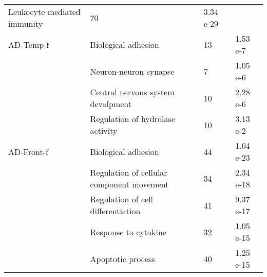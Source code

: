 \begin{table}[!ht]
\begin{tabularx}{1.0\textwidth}{L{2cm}L{2.9cm}L{8cm}C{1.1cm}}
  Leukocyte mediated immunity &
  70 &
  3.34 e-29 \\
AD-Temp-f &
  Biological adhesion &
  13 &
  1.53 e-7 \\
 &
  Neuron-neuron synapse &
  7 &
  1.05 e-6 \\
 &
  Central nervous system devolpment &
  10 &
  2.28 e-6 \\
 &
  Regulation of hydrolase activity &
  10 &
  3.13 e-2 \\
AD-Front-f &
  Biological adhesion &
  44 &
  1.04 e-23 \\
 &
  Regulation of cellular component movement &
  34 &
  2.34 e-18 \\
 &
  Regulation of cell differentiation &
  41 &
  9.37 e-17 \\
 &
  Response to cytokine &
  32 &
  1.05 e-15 \\
 &
  Apoptotic process &
  40 &
  1.25 e-15 \\
\bottomrule

\end{tabularx}
\end{table}